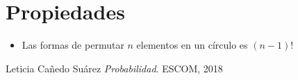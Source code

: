 \documentclass[12pt, fleqn]{report}                             %
\theoremstyle{break}                                            %
\begin{document}
        \clearpage
        \section{Propiedades}

            \begin{itemize}
               
               \item 
                    Las formas de permutar $n$ elementos en un círculo es
                    $(n-1)!$

           \end{itemize}   



\begin{thebibliography}{10}

        Leticia Cañedo Suárez
        \textit{Probabilidad}. 
        ESCOM, 2018

\end{thebibliography}
\end{document}
